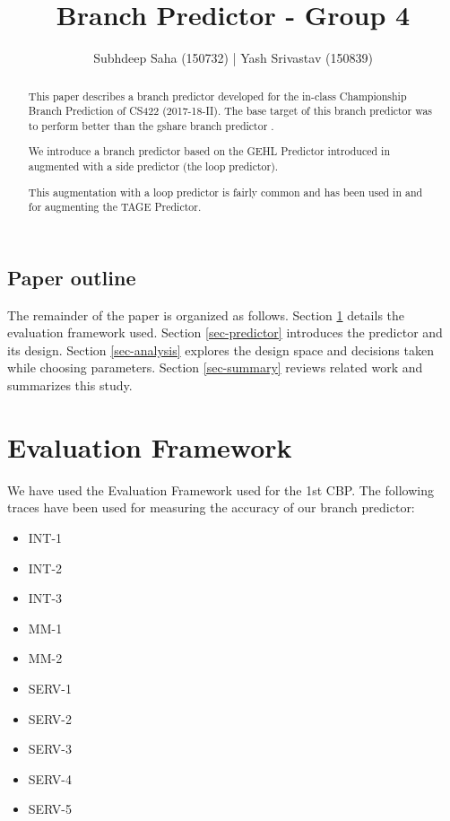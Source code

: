 \documentclass{sig-alternate}
\title{Branch Predictor - Group 4}
\author{Subhdeep Saha (150732) | Yash Srivastav (150839)}
\begin{document}
\maketitle
\thispagestyle{firstpage}
\pagestyle{plain}

\begin{abstract}

  This paper describes a branch predictor developed for the in-class Championship
  Branch Prediction of CS422 (2017-18-II). The base target of this branch predictor
  was to perform better than the gshare branch predictor \cite{combine-bp}.

  We introduce a branch predictor based on the GEHL Predictor introduced in \cite{ogehl}
  augmented with a side predictor (the loop predictor).

  This augmentation with a loop predictor is fairly common and has been used in
  \cite{ltage} and \cite{tagescl} for augmenting the TAGE Predictor.
\end{abstract}

\subsection*{Paper outline}

The remainder of the paper is organized as follows.
Section \ref{sec-framework} details the evaluation framework used.
Section \ref{sec-predictor} introduces the predictor and its design.
Section \ref{sec-analysis} explores the design space and decisions
taken while choosing parameters.
Section \ref{sec-summary} reviews related work and summarizes
this study.

\section{Evaluation Framework}
\label{sec-framework}

We have used the Evaluation Framework used for the 1st CBP. The following
traces have been used for measuring the accuracy of our branch predictor:

\begin{itemize}
\item INT-1
\item INT-2
\item INT-3
\item MM-1
\item MM-2
\item SERV-1
\item SERV-2
\item SERV-3
\item SERV-4
\item SERV-5
\end{itemize}
\end{document}
